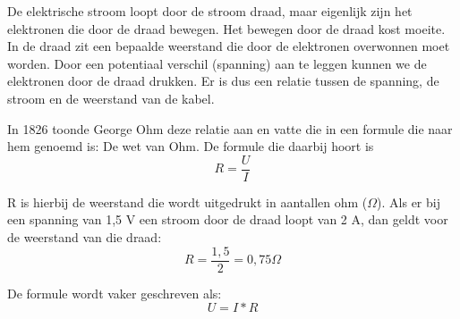 De elektrische stroom loopt door de stroom draad, maar eigenlijk zijn het elektronen die door de draad bewegen. Het bewegen door de draad kost moeite. In de draad zit een bepaalde weerstand die door de elektronen overwonnen moet worden. Door een potentiaal verschil (spanning) aan te leggen kunnen we de elektronen door de draad drukken. Er is dus een relatie tussen de spanning, de stroom en de weerstand van de kabel.

In 1826 toonde George Ohm deze relatie aan en vatte die in een formule die naar hem genoemd is: De wet van Ohm. De formule die daarbij hoort is \[ R = \frac{U}{I} \]

R is hierbij de weerstand die wordt uitgedrukt in aantallen ohm ($\Omega$). Als er bij een spanning van 1,5 V een stroom door de draad loopt van 2 A, dan geldt voor de weerstand van die draad: \[ R = \frac{1,5}{2} = 0,75 \Omega \]

De formule wordt vaker geschreven als: \[ U = I*R \]

